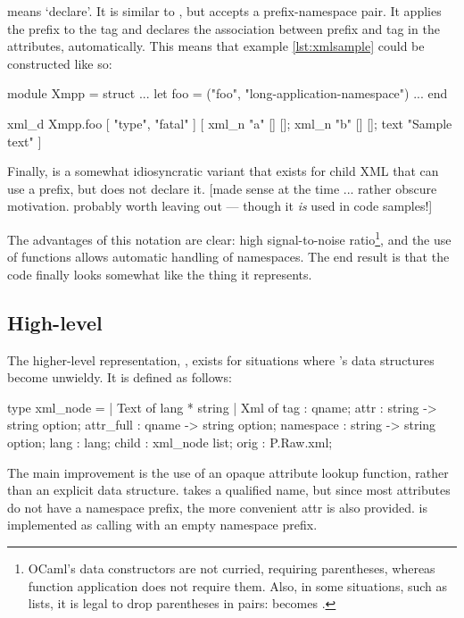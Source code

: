\documentclass[12pt,a4paper,twoside,openright]{report}
\begin{document}
{ means `declare'. It is similar to , but accepts a prefix-namespace pair. It applies the prefix to the tag and declares the association between prefix and tag in the attributes, automatically. This means that example \ref{lst:xmlsample} could be constructed like so:

\begin{ocaml}
module Xmpp = struct
  ...
  let foo = ("foo", "long-application-namespace")
  ...
end

xml_d Xmpp.foo [ "type", "fatal" ] [
  xml_n "a" [] [];
  xml_n "b" [] [];
  text "Sample text"
]
\end{ocaml}

Finally,  is a somewhat idiosyncratic variant that exists for child XML that can use a prefix, but does not declare it. [made sense at the time ... rather obscure motivation. probably worth leaving out --- though it \emph{is} used in code samples!]

The advantages of this notation are clear: high signal-to-noise ratio\footnote{OCaml's data constructors are not curried, requiring parentheses, whereas function application does not require them. Also, in some situations, such as lists, it is legal to drop parentheses in pairs: \code{[ (x,y); (z,w) ]} becomes \code{[ x,y; z,w ]}.}, and the use of functions allows automatic handling of namespaces. The end result is that the code finally looks somewhat like the thing it represents.

\subsection{High-level }
The higher-level representation, , exists for situations where 's data structures become unwieldy. It is defined as follows:

\begin{ocaml}
type xml_node =
| Text of lang * string
| Xml of {
  tag    : qname;
  attr   : string -> string option;
  attr_full : qname -> string option;
  namespace : string -> string option;
  lang  : lang;
  child : xml_node list;
  orig  : P.Raw.xml;
}
\end{ocaml}

The main improvement is the use of an opaque attribute lookup function, rather than an explicit data structure.  takes a qualified name, but since most attributes do not have a namespace prefix, the more convenient attr is also provided.  is implemented as calling  with an empty namespace prefix.

}
\end{document}
